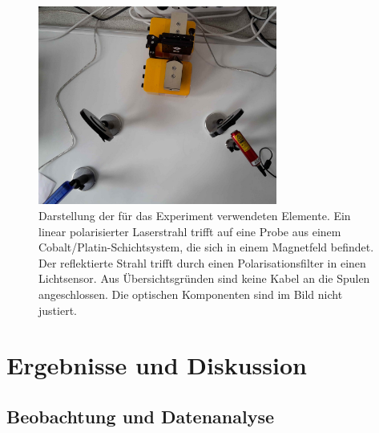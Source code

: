 \documentclass[
	a4paper,
	12pt,
	pagesize,
	ngerman
]{scrartcl}
\begin{document}
	\begin{figure}[H] 
		\includegraphics[width=0.7\textwidth]{O4_Aufbau} 
		\centering
		\caption{Darstellung der für das Experiment verwendeten Elemente. Ein linear polarisierter Laserstrahl trifft auf eine Probe aus einem Cobalt/Platin-Schichtsystem, die sich in einem Magnetfeld befindet. Der reflektierte Strahl trifft durch einen Polarisationsfilter in einen Lichtsensor. Aus Übersichtsgründen sind keine Kabel an die Spulen angeschlossen. Die optischen Komponenten sind im Bild nicht justiert.} 
		\label{fig_aufbau}
		\centering
	\end{figure}
	
	\section{Ergebnisse und Diskussion}

	\subsection{Beobachtung und Datenanalyse}
\end{document}

